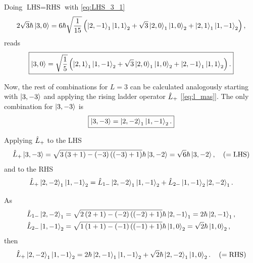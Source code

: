 Doing $\text{LHS} = \text{RHS}$ with \cref{eq:LHS_3_1} 
\begin{equation}
    2 \sqrt{3} \hbar \Ket{3,0} =
    6 \hbar \sqrt{\frac{1}{15}} \left( 
    \Ket{2,-1}_1 \Ket{1,1}_2 + \sqrt{3} \Ket{2,0}_1 \Ket{1,0}_2 + \Ket{2,1}_1 \Ket{1,-1}_2 \right),
\end{equation}
reads
\begin{equation}
    \boxed{
        \Ket{3,0} =
        \sqrt{\frac{1}{5}} \left( 
        \Ket{2,1}_1 \Ket{1,-1}_2 + \sqrt{3} \Ket{2,0}_1 \Ket{1,0}_2 + \Ket{2,-1}_1 \Ket{1,1}_2 \right).
    }
\end{equation}

Now, the rest of combinations for $L=3$ can be calculated analogously starting with $\Ket{3,-3}$ and applying the rising ladder operator $\hat{L}_{+}$ [\cref{eq:l_mas}].
The only combination for $\Ket{3,-3}$ is 
\begin{equation}
    \boxed{
        \Ket{3,-3} = \Ket{2,-2}_1 \Ket{1,-1}_2.
    }
\end{equation}

Applying $\hat{L}_{+}$ to the LHS
\begin{equation}
    \hat{L}_{+} \Ket{3,-3} = \sqrt{3\left( 3 + 1 \right) - (-3)\left( (-3) + 1 \right)} \hbar \Ket{3,-2} = \sqrt{6} \hbar \Ket{3,-2}, \quad \left( = \text{LHS} \right)
\end{equation}
and to the RHS
\begin{equation}
    \hat{L}_{+} \Ket{2,-2}_1 \Ket{1,-1}_2 = \hat{L}_{1-} \Ket{2,-2}_1 \Ket{1,-1}_2 + \hat{L}_{2-} \Ket{1,-1}_2 \Ket{2,-2}_1.
\end{equation}

As
\begin{align}
    \hat{L}_{1-} \Ket{2,-2}_1  &= \sqrt{2\left( 2 + 1 \right) - \left( -2 \right)\left( \left( -2 \right) + 1 \right)} \hbar \Ket{2,-1}_1 = 2 \hbar \Ket{2,-1}_1, \\
    \hat{L}_{2-} \Ket{1,-1}_2 &= \sqrt{1\left( 1 + 1 \right) - \left( -1 \right)\left( \left( -1 \right) + 1 \right)} \hbar \Ket{1,0}_2 = \sqrt{2} \hbar \Ket{1,0}_2,
\end{align}
then
\begin{equation}
    \hat{L}_{+} \Ket{2,-2}_1 \Ket{1,-1}_2 = 2 \hbar \Ket{2,-1}_1 \Ket{1,-1}_2 + \sqrt{2} \hbar \Ket{2,-2}_1 \Ket{1,0}_2.  \quad \left( =\text{RHS} \right)
\end{equation}

